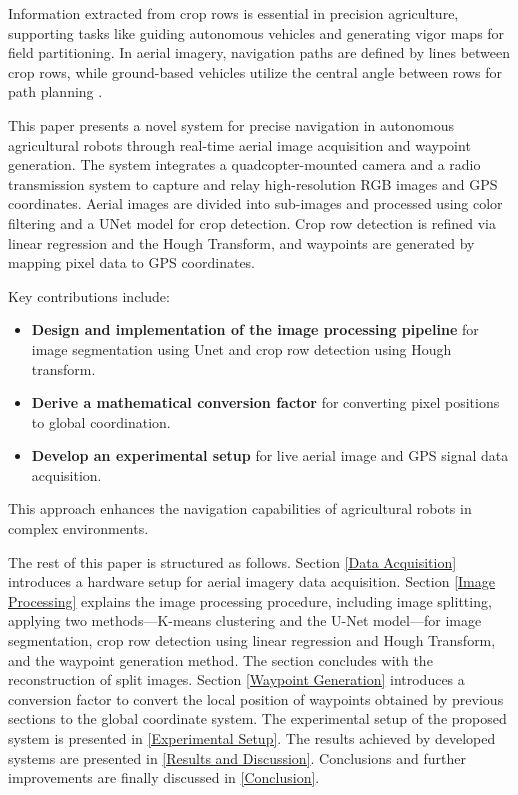 \documentclass[conference]{IEEEtran}
\begin{document}
	Information extracted from crop rows is essential in precision agriculture, supporting tasks like guiding autonomous vehicles and generating vigor maps for field partitioning. In aerial imagery, navigation paths are defined by lines between crop rows, while ground-based vehicles utilize the central angle between rows for path planning \cite{b11,b1}.
	
	
	
	This paper presents a novel system for precise navigation in autonomous agricultural robots through real-time aerial image acquisition and waypoint generation. The system integrates a quadcopter-mounted camera and a radio transmission system to capture and relay high-resolution RGB images and GPS coordinates. Aerial images are divided into sub-images and processed using color filtering and a UNet model for crop detection. Crop row detection is refined via linear regression and the Hough Transform, and waypoints are generated by mapping pixel data to GPS coordinates. 
	
	Key contributions include: 
	
	\begin{itemize}
		
		\item \textbf{Design and implementation of the image processing pipeline} for image segmentation using Unet and crop row detection using Hough transform.
		\item \textbf{Derive a mathematical conversion factor} for converting pixel positions to global coordination.
		\item \textbf{Develop an experimental setup} for live aerial image and GPS signal data acquisition.
	\end{itemize}
	
	This approach enhances the navigation capabilities of agricultural robots in complex environments.
	
	The rest of this paper is structured as follows. Section \ref{Data Acquisition} introduces a hardware setup for aerial imagery data acquisition. Section \ref{Image Processing} explains the image processing procedure, including image splitting, applying two methods—K-means clustering and the U-Net model—for image segmentation, crop row detection using linear regression and Hough Transform, and the waypoint generation method. The section concludes with the reconstruction of split images. Section \ref{Waypoint Generation} introduces a conversion factor to convert the local position of waypoints obtained by previous sections to the global coordinate system. The experimental setup of the proposed system is presented in \ref{Experimental Setup}. The results achieved by developed systems are presented in \ref{Results and Discussion}. Conclusions and further improvements are finally discussed in
	\ref{Conclusion}.
	
\end{document}
